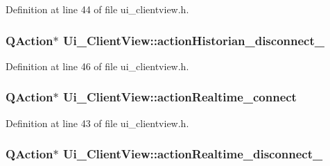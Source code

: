 Definition at line 44 of file ui\+\_\+clientview.\+h.

\hypertarget{class_ui___client_view_afdc3c5739fa449540bdf53051c1ca3cd}{}
\subsubsection[{action\+Historian\+\_\+disconnect\+\_\+2}]{\setlength{\rightskip}{0pt plus 5cm}Q\+Action$\ast$ Ui\+\_\+\+Client\+View\+::action\+Historian\+\_\+disconnect\+\_}\label{class_ui___client_view_afdc3c5739fa449540bdf53051c1ca3cd}


Definition at line 46 of file ui\+\_\+clientview.\+h.

\hypertarget{class_ui___client_view_ab5637af13c91e8eec2ab333f574419de}{}
\subsubsection[{action\+Realtime\+\_\+connect}]{\setlength{\rightskip}{0pt plus 5cm}Q\+Action$\ast$ Ui\+\_\+\+Client\+View\+::action\+Realtime\+\_\+connect}\label{class_ui___client_view_ab5637af13c91e8eec2ab333f574419de}


Definition at line 43 of file ui\+\_\+clientview.\+h.

\hypertarget{class_ui___client_view_aad5eae02657f51e77dd7627d4d7469e6}{}
\subsubsection[{action\+Realtime\+\_\+disconnect\+\_\+2}]{\setlength{\rightskip}{0pt plus 5cm}Q\+Action$\ast$ Ui\+\_\+\+Client\+View\+::action\+Realtime\+\_\+disconnect\+\_}\label{class_ui___client_view_aad5eae02657f51e77dd7627d4d7469e6}


